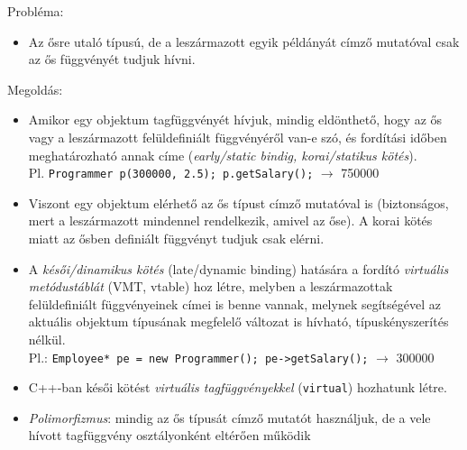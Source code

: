 \begin{frame}
    Probléma:
    \begin{itemize}
        \item Az ősre utaló típusú, de a leszármazott egyik példányát címző mutatóval csak az ős függvényét tudjuk hívni.
    \end{itemize}
    Megoldás:
    \begin{itemize}
        \item Amikor egy objektum tagfüggvényét hívjuk, mindig eldönthető, hogy az ős vagy a leszármazott felüldefiniált függvényéről van-e szó, és fordítási időben meghatározható annak címe (\emph{early/static bindig, korai/statikus kötés}). \\ Pl. \texttt{Programmer p(300000, 2.5); p.getSalary();} $\to$ 750000
        \item Viszont egy objektum elérhető az ős típust címző mutatóval is (biztonságos, mert a leszármazott mindennel rendelkezik, amivel az őse). A korai kötés miatt az ősben definiált függvényt tudjuk csak elérni.
    \end{itemize}
\end{frame}

\begin{frame}
    \begin{itemize}
        \item A \emph{késői/dinamikus kötés} (late/dynamic binding) hatására a fordító \emph{virtuális metódustáblát} (VMT, vtable) hoz létre, melyben a leszármazottak felüldefiniált függvényeinek címei is benne vannak, melynek segítségével az aktuális objektum típusának megfelelő változat is hívható, típuskényszerítés nélkül. \\ Pl.: \texttt{Employee* pe = new Programmer(); pe->getSalary();} $\to$ 300000
        \item C++-ban késői kötést \emph{virtuális tagfüggvényekkel} (\texttt{virtual}) hozhatunk létre.
        \item \emph{Polimorfizmus}: mindig az ős típusát címző mutatót használjuk, de a vele hívott tagfüggvény osztályonként eltérően működik
    \end{itemize}
\end{frame}

